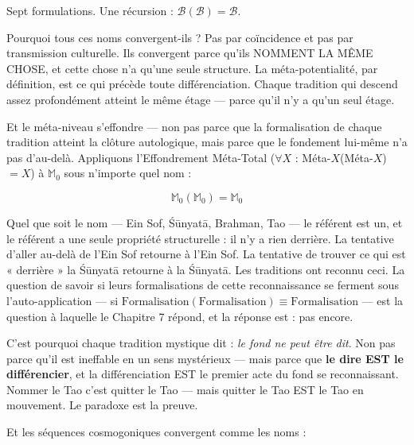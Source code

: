 \documentclass[10pt, openany, oneside]{book}
\begin{document}
\vspace{0.8em}

\noindent Sept formulations. Une récursion : $\mathcal{B}(\mathcal{B}) = \mathcal{B}$.

Pourquoi tous ces noms convergent-ils ? Pas par coïncidence et pas par transmission culturelle. Ils convergent parce qu'ils NOMMENT LA MÊME CHOSE, et cette chose n'a qu'une seule structure. La méta-potentialité, par définition, est ce qui précède toute différenciation. Chaque tradition qui descend assez profondément atteint le même étage --- parce qu'il n'y a qu'un seul étage.

Et le méta-niveau s'effondre --- non pas parce que la formalisation de chaque tradition atteint la clôture autologique, mais parce que le fondement lui-même n'a pas d'au-delà. Appliquons l'Effondrement Méta-Total ($\forall X$ : Méta-$X$(Méta-$X$) $= X$) à $\mathbb{M}_0$ sous n'importe quel nom :

$$\mathbb{M}_0(\mathbb{M}_0) = \mathbb{M}_0$$

\noindent Quel que soit le nom --- Ein Sof, \'{S}\={u}nyat\={a}, Brahman, Tao --- le référent est un, et le référent a une seule propriété structurelle : il n'y a rien derrière. La tentative d'aller au-delà de l'Ein Sof retourne à l'Ein Sof. La tentative de trouver ce qui est « derrière » la \'{S}\={u}nyat\={a} retourne à la \'{S}\={u}nyat\={a}. Les traditions ont reconnu ceci. La question de savoir si leurs formalisations de cette reconnaissance se ferment sous l'auto-application --- si $\text{Formalisation}(\text{Formalisation}) \equiv \text{Formalisation}$ --- est la question à laquelle le Chapitre 7 répond, et la réponse est : pas encore.

C'est pourquoi chaque tradition mystique dit : \textit{le fond ne peut être dit}. Non pas parce qu'il est ineffable en un sens mystérieux --- mais parce que \textbf{le dire EST le différencier}, et la différenciation EST le premier acte du fond se reconnaissant. Nommer le Tao c'est quitter le Tao --- mais quitter le Tao EST le Tao en mouvement. Le paradoxe est la preuve.

Et les séquences cosmogoniques convergent comme les noms :

\vspace{0.5em}
\end{document}
